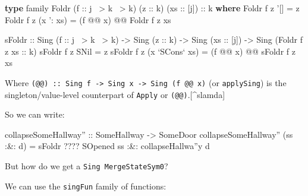 \documentclass[]{article}
\newenvironment{Shaded}{}{}
\newcommand{\DataTypeTok}[1]{\textcolor[rgb]{0.56,0.13,0.00}{#1}}
\newcommand{\FunctionTok}[1]{\textcolor[rgb]{0.02,0.16,0.49}{#1}}
\newcommand{\KeywordTok}[1]{\textcolor[rgb]{0.00,0.44,0.13}{\textbf{#1}}}
\newcommand{\NormalTok}[1]{#1}
\newcommand{\OtherTok}[1]{\textcolor[rgb]{0.00,0.44,0.13}{#1}}
\begin{document}
\begin{Shaded}
\begin{Highlighting}[]
\KeywordTok{type}\NormalTok{ family }\DataTypeTok{Foldr}\NormalTok{ (}\OtherTok{f ::}\NormalTok{ j }\FunctionTok{~>}\NormalTok{ k }\FunctionTok{~>}\NormalTok{ k) (}\OtherTok{z ::}\NormalTok{ k) (}\OtherTok{xs ::}\NormalTok{ [j])}\OtherTok{ ::}\NormalTok{ k }\KeywordTok{where}
    \DataTypeTok{Foldr}\NormalTok{ f z '[]       }\FunctionTok{=}\NormalTok{ z}
    \DataTypeTok{Foldr}\NormalTok{ f z (x '}\FunctionTok{:}\NormalTok{ xs) }\FunctionTok{=}\NormalTok{ (f }\FunctionTok{@@}\NormalTok{ x) }\FunctionTok{@@} \DataTypeTok{Foldr}\NormalTok{ f z xs}

\NormalTok{sFoldr}
\OtherTok{    ::} \DataTypeTok{Sing}\NormalTok{ (}\OtherTok{f ::}\NormalTok{ j }\FunctionTok{~>}\NormalTok{ k }\FunctionTok{~>}\NormalTok{ k)}
    \OtherTok{->} \DataTypeTok{Sing}\NormalTok{ (}\OtherTok{z ::}\NormalTok{ k)}
    \OtherTok{->} \DataTypeTok{Sing}\NormalTok{ (}\OtherTok{xs ::}\NormalTok{ [j])}
    \OtherTok{->} \DataTypeTok{Sing}\NormalTok{ (}\DataTypeTok{Foldr}\NormalTok{ f z}\OtherTok{ xs ::}\NormalTok{ k)}
\NormalTok{sFoldr f z }\DataTypeTok{SNil}           \FunctionTok{=}\NormalTok{ z}
\NormalTok{sFoldr f z (x }\OtherTok{`SCons`}\NormalTok{ xs) }\FunctionTok{=}\NormalTok{ (f }\FunctionTok{@@}\NormalTok{ x) }\FunctionTok{@@}\NormalTok{ sFoldr f z xs}
\end{Highlighting}
\end{Shaded}

Where
\texttt{(@@)\ ::\ Sing\ f\ -\textgreater{}\ Sing\ x\ -\textgreater{}\ Sing\ (f\ @@\ x)}
(or \texttt{applySing}) is the singleton/value-level counterpart of
\texttt{Apply} or \texttt{(@@)}.{[}\^{}slamda{]}

So we can write:

\begin{Shaded}
\begin{Highlighting}[]
\OtherTok{collapseSomeHallway'' ::} \DataTypeTok{SomeHallway} \OtherTok{->} \DataTypeTok{SomeDoor}
\NormalTok{collapseSomeHallway'' (ss }\FunctionTok{:&:}\NormalTok{ d) }\FunctionTok{=}\NormalTok{ sFoldr }\FunctionTok{????} \DataTypeTok{SOpened}\NormalTok{ ss}
                               \FunctionTok{:&:}\NormalTok{ collapseHallwa''y d}
\end{Highlighting}
\end{Shaded}

But how do we get a \texttt{Sing\ MergeStateSym0}?

We can use the \texttt{singFun} family of functions:
\end{document}
